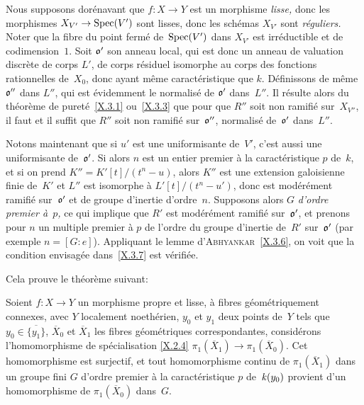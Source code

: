 Nous supposons dor\'enavant que $f\colon X\to Y$ est un morphisme
\emph{lisse,} donc les morphismes $X_{V'}\to \Spec(V')$ sont lisses,
donc les sch\'emas $X_{V'}$ sont \emph{réguliers.} Noter que la
fibre du point ferm\'e de~$\operatorname{Spec}(V')$ dans $X_{V'}$ est
irr\'eductible et de codimension~$1$. Soit $\mathfrak{o'}$ son anneau
local, qui est donc un anneau de valuation discr\`ete de corps
$L'$, de corps r\'esiduel isomorphe au corps des fonctions
rationnelles de~$X_0$, donc ayant m\^eme caract\'eristique que
$k$. D\'efinissons de m\^eme $\mathfrak{o''}$ dans $L''$, qui est
\'evidemment le normalis\'e de
$\mathfrak{o'}$
dans~$L''$. Il
r\'esulte alors du th\'eor\`eme de puret\'e~\ref{X.3.1}
ou~\ref{X.3.3} que pour que $R''$ soit non ramifi\'e sur~$X_{V''}$,
il faut et il suffit que $R''$ soit non ramifi\'e sur~$\mathfrak{o''}$,
normalis\'e de~$\mathfrak{o'}$ dans~$L''$.

Notons maintenant que si $u'$ est une uniformisante de~$V'$, c'est
aussi une uniformisante de~$\mathfrak{o'}$. Si alors $n$ est un entier
premier \`a la caract\'eristique $p$ de~$k$, et si on prend
$K''=K'[t]/(t^n-u)$, alors
$K''$
est une extension galoisienne finie
de~$K'$ et $L''$ est isomorphe \`a $L'[t]/(t^n-u')$, donc est
mod\'er\'ement ramifi\'e sur~$\mathfrak{o'}$ et de groupe d'inertie
d'ordre~$n$. Supposons alors $G$ \emph{d'ordre premier à~$p$,} ce
qui implique que $R'$ est mod\'er\'ement ramifi\'e sur~$\mathfrak{o'}$, et prenons pour $n$ un multiple premier \`a $p$ de
l'ordre du groupe d'inertie de~$R'$ sur~$\mathfrak{o'}$ (par exemple
$n=[G\colon e]$). Appliquant le
lemme d'\textsc{Abhyankar}~\ref{X.3.6}, on
voit que la condition envisag\'ee dans~\ref{X.3.7} est
v\'erifi\'ee.

Cela prouve le th\'eor\`eme suivant:

\begin{theoreme}
\label{X.3.8}
Soient $f\colon X\to Y$ un morphisme propre et lisse, \`a fibres
g\'eo\-m\'e\-tri\-que\-ment connexes, avec $Y$ localement noeth\'erien,
$y_0$ et $y_1$ deux points de~$Y$ tels que
$y_0\in\overline{\{y_1\}}$,
$\overline{X}_0$ et $\overline{X}_1$ les fibres g\'eom\'etriques
correspondantes, consid\'erons l'homomorphisme de sp\'ecialisation
\eqref{X.2.4} $\pi_1(\overline X_1)\to\pi_1(\overline X_0)$. Cet
homomorphisme est surjectif, et tout homomorphisme continu de
$\pi_1(\overline X_1)$ dans un groupe fini $G$ d'ordre premier \`a
la caract\'eristique $p$ de~$\mathit{k}(y_0)$ provient d'un homomorphisme de
$\pi_1(\overline{X}_0)$ dans~$G$.
\end{theoreme}

